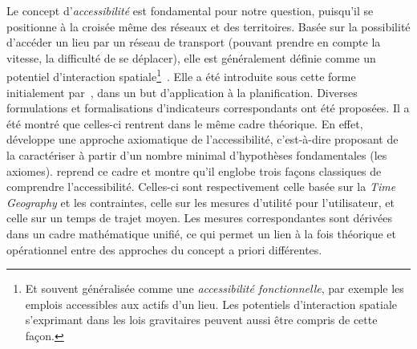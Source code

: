 {Le concept d'\emph{accessibilité} est fondamental pour notre question, puisqu'il se positionne à la croisée même des réseaux et des territoires. Basée sur la possibilité d'accéder un lieu par un réseau de transport (pouvant prendre en compte la vitesse, la difficulté de se déplacer), elle est généralement définie comme un potentiel d'interaction spatiale\footnote{Et souvent généralisée comme une \emph{accessibilité fonctionnelle}, par exemple les emplois accessibles aux actifs d'un lieu. Les potentiels d'interaction spatiale s'exprimant dans les lois gravitaires peuvent aussi être compris de cette façon.}~\cite{bavoux2005geographie}. Elle a été introduite sous cette forme initialement par~\cite{hansen1959accessibility}, dans un but d'application à la planification. Diverses formulations et formalisations d'indicateurs correspondants ont été proposées. Il a été montré que celles-ci rentrent dans le même cadre théorique. En effet, \cite{weibull1976axiomatic} développe une approche axiomatique de l'accessibilité, c'est-à-dire proposant de la caractériser à partir d'un nombre minimal d'hypothèses fondamentales (les axiomes). \cite{miller1999measuring} reprend ce cadre et montre qu'il englobe trois façons classiques de comprendre l'accessibilité. Celles-ci sont respectivement celle basée sur la \emph{Time Geography} et les contraintes, celle sur les mesures d'utilité pour l'utilisateur, et celle sur un temps de trajet moyen. Les mesures correspondantes sont dérivées dans un cadre mathématique unifié, ce qui permet un lien à la fois théorique et opérationnel entre des approches du concept a priori différentes.
}



